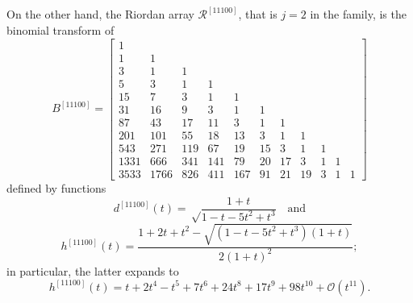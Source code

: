 On the other hand, the Riordan array $\mathcal{R}^{[11100]}$, that is $j=2$ in
the family, is the binomial transform of
\begin{displaymath}
B^{[11100]} =\left[\begin{array}{ccccccccccc}1 &  &  &  &  &  &  &  &  &  & \\1 & 1 &  &  &  &  &  &  &  &  & \\3 & 1 & 1 &  &  &  &  &  &  &  & \\5 & 3 & 1 & 1 &  &  &  &  &  &  & \\15 & 7 & 3 & 1 & 1 &  &  &  &  &  & \\31 & 16 & 9 & 3 & 1 & 1 &  &  &  &  & \\87 & 43 & 17 & 11 & 3 & 1 & 1 &  &  &  & \\201 & 101 & 55 & 18 & 13 & 3 & 1 & 1 &  &  & \\543 & 271 & 119 & 67 & 19 & 15 & 3 & 1 & 1 &  & \\1331 & 666 & 341 & 141 & 79 & 20 & 17 & 3 & 1 & 1 & \\3533 & 1766 & 826 & 411 & 167 & 91 & 21 & 19 & 3 & 1 & 1\end{array}\right]
\end{displaymath}
defined by functions 
\begin{displaymath}
d^{[11100]}(t)=\sqrt\frac{1+t}{1-t-5t^{2}+t^{3}} \quad \text{and}
\end{displaymath}
\begin{displaymath}
h^{[11100]}(t)=\frac{1+2t+t^{2}-\sqrt{(1-t-5t^{2}+t^{3})(1+t)}}{2(1+t)^{2}};
\end{displaymath}
in particular, the latter expands to 
\begin{displaymath}
h^{[11100]}(t)=t + 2 t^{4} - t^{5} + 7 t^{6} + 24 t^{8} + 17 t^{9} + 98 t^{10} +
\mathcal{O}\left(t^{11}\right).
\end{displaymath}

\iffalse
Furthermore, the Riordan array $\mathcal{R}^{[1111000]}$, that is $j=3$ in the
family, is the binomial transform of
\begin{displaymath}
B^{[1111000]} =\left[\begin{array}{ccccccccccc}1 &  &  &  &  &  &  &  &  &  & \\1 & 1 &  &  &  &  &  &  &  &  & \\3 & 1 & 1 &  &  &  &  &  &  &  & \\7 & 4 & 1 & 1 &  &  &  &  &  &  & \\17 & 8 & 5 & 1 & 1 &  &  &  &  &  & \\49 & 25 & 9 & 6 & 1 & 1 &  &  &  &  & \\123 & 61 & 34 & 10 & 7 & 1 & 1 &  &  &  & \\351 & 176 & 74 & 44 & 11 & 8 & 1 & 1 &  &  & \\945 & 472 & 242 & 88 & 55 & 12 & 9 & 1 & 1 &  & \\2641 & 1321 & 610 & 322 & 103 & 67 & 13 & 10 & 1 & 1 & \\7363 & 3681 & 1811 & 766 & 417 & 119 & 80 & 14 & 11 & 1 & 1\end{array}\right]
\end{displaymath}
\fi

